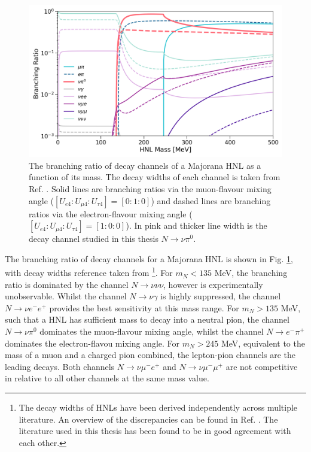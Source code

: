 \begin{figure}[t] 
\centering    
\includegraphics[width=1.0\textwidth]{branching_ratio}
\caption[branching_ratio]{
The branching ratio of decay channels of a Majorana HNL as a function of its mass.
The decay widths of each channel is taken from Ref. \cite{HNLBin, SBNHNL, HNLZarko}.
Solid lines are branching ratios via the muon-flavour mixing angle ($[U_{e4}:U_{\mu4}:U_{\tau4}]=[0:1:0]$) and dashed lines are branching ratios via the electron-flavour mixing angle ($[U_{e4}:U_{\mu4}:U_{\tau4}]=[1:0:0]$).
In pink and thicker line width is the decay channel studied in this thesis $N\rightarrow \nu \pi^{0}.$
}
\label{fig:branching_ratio}
\end{figure}

The branching ratio of decay channels for a Majorana HNL is shown in Fig. \ref{fig:branching_ratio}, with decay widths reference taken from \cite {HNLBin, SBNHNL, HNLZarko}\footnote{The decay widths of HNLs have been derived independently across multiple literature. An overview of the discrepancies can be found in Ref. \cite{HNLZarko}. The literature used in this thesis has been found to be in good agreement with each other.}.
For $m_{N} < 135$ MeV, the branching ratio is dominated by the channel $N\rightarrow \nu\nu\nu$, however is experimentally unobservable.
Whilst the channel $N\rightarrow \nu \gamma$ is highly suppressed, the channel $N\rightarrow \nu e^{-}e^{+}$ provides the best sensitivity at this mass range.
For $m_{N} > 135$ MeV, such that a HNL has sufficient mass to decay into a neutral pion, the channel $N\rightarrow \nu \pi^{0}$ dominates the muon-flavour mixing angle, whilst the channel $N\rightarrow e^{-}\pi^{+}$ dominates the electron-flavou mixing angle.
For $m_{N} > 245$ MeV, equivalent to the mass of a muon and a charged pion combined, the lepton-pion channels are the leading decays. 
Both channels $N\rightarrow \nu \mu^{-}e^{+}$ and $N\rightarrow \nu \mu^{-}\mu^{+}$ are not competitive in relative to all other channels at the same mass value.  


